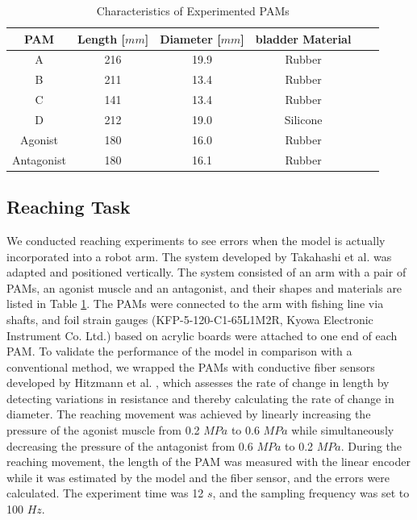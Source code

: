  \begin{table}[t]
    \centering
    \caption{Characteristics of Experimented PAMs}
    \begin{tabular}{c|ccccc}
        \hline
        PAM & Length [$\si{mm}$] & Diameter [$\si{mm}$] & bladder Material\\
        \hline \hline
        A & 216 & 19.9 &  Rubber \\
        B &211  & 13.4 &  Rubber \\
        C & 141 & 13.4 &  Rubber \\
        D & 212 & 19.0 & Silicone \\
        Agonist & 180 & 16.0 & Rubber \\
        Antagonist & 180 & 16.1 & Rubber \\
        \hline
    \end{tabular}
\label{tab:PAM}
\end{table}

\subsection{Reaching Task}
We conducted reaching experiments to see errors when the model is actually incorporated into a robot arm. The system developed by Takahashi et al.\cite{takahashi} was adapted and positioned vertically. The system consisted of an arm with a pair of PAMs, an agonist muscle and an antagonist, and their shapes and materials are listed in Table \ref{tab:PAM}. The PAMs were connected to the arm with fishing line via shafts, and foil strain gauges (KFP-5-120-C1-65L1M2R, Kyowa Electronic Instrument Co. Ltd.) based on acrylic boards were attached to one end of each PAM. To validate the performance of the model in comparison with a conventional method, we wrapped the PAMs with conductive fiber sensors developed by Hitzmann et al. \cite{fiber}, which assesses the rate of change in length by detecting variations in resistance and thereby calculating the rate of change in diameter.
The reaching movement was achieved by linearly increasing the pressure of the agonist muscle from 0.2 $\si{MPa}$ to 0.6 $\si{MPa}$ while simultaneously decreasing the pressure of the antagonist from 0.6 $\si{MPa}$ to 0.2 $\si{MPa}$. During the reaching movement, the length of the PAM was measured with the linear encoder while it was estimated by the model and the fiber sensor, and the errors were calculated. The experiment time was 12 $\si{s}$, and the sampling frequency was set to 100 $\si{Hz}$.

